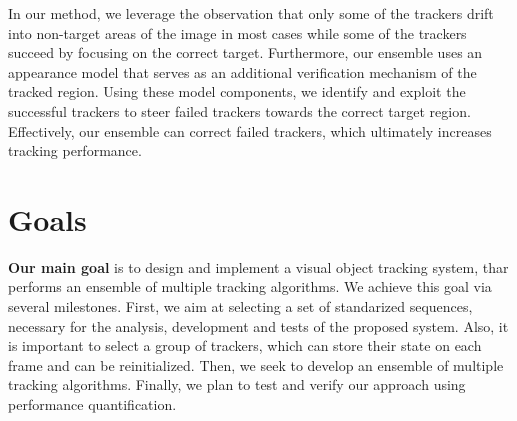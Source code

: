 \iffalse
Taking this into account, we consider an approach that combining the
virtues of different algorithms, while evading their weaknesses, could
outperform each single algorithm. Just as "two heads are better than one",
making trackers perform this task together in an unknown scenario, may
result in a higher level of performance and achievement, than could be
obtained individually. This is what in psychology states as "positive
interdependence", the ability of group members to encourage and
facilitate each other's efforts \cite{Johnson1998}.
\fi

In our method, we leverage the observation that only some of the trackers
drift into non-target areas of the image in most cases while some of the
trackers succeed by focusing on the correct target.
Furthermore, our ensemble uses an appearance model
that serves as an additional verification mechanism of the tracked region.
Using these model components, we identify and exploit the successful trackers
to steer failed trackers towards the correct target region. Effectively,
our ensemble can correct failed trackers, which ultimately increases
tracking performance.

\section{Goals} \label{sec::goals}

\textbf{Our main goal} is to design and implement a visual object tracking
system, thar performs an ensemble of multiple tracking algorithms. We achieve
this goal via several milestones. First, we
aim at selecting a set of standarized sequences, necessary for the analysis,
development and tests of the proposed system. Also, it is important to
select a group of trackers, which can store their state on each frame and can
be reinitialized. Then, we seek to develop an ensemble of multiple tracking
algorithms. Finally, we plan to test and verify our approach using performance
quantification. 

